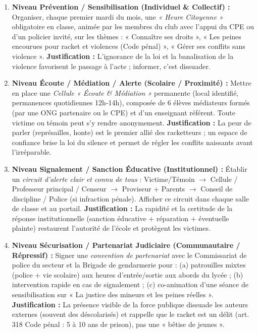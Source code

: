 \documentclass[11pt]{article}
\begin{document}
\begin{exoresolu}
\begin{enumerate}
\item \textbf{Niveau Prévention / Sensibilisation (Individuel \& Collectif) :} Organiser, chaque premier mardi du mois, une \emph{« Heure Citoyenne »} obligatoire en classe, animée par les membres du club avec l'appui du CPE ou d'un policier invité, sur les thèmes : « Connaître ses droits », « Les peines encourues pour racket et violences (Code pénal) », « Gérer ses conflits sans violence ». \textbf{Justification :} L'ignorance de la loi et la banalisation de la violence favorisent le passage à l'acte ; informer, c'est dissuader.
\item \textbf{Niveau Écoute / Médiation / Alerte (Scolaire / Proximité) :} Mettre en place une \emph{Cellule « Écoute \& Médiation »} permanente (local identifié, permanences quotidiennes 12h-14h), composée de 6 élèves médiateurs formés (par une ONG partenaire ou le CPE) et d'un enseignant référent. Toute victime ou témoin peut s'y rendre anonymement. \textbf{Justification :} La peur de parler (représailles, honte) est le premier allié des racketteurs ; un espace de confiance brise la loi du silence et permet de régler les conflits naissants avant l'irréparable.
\item \textbf{Niveau Signalement / Sanction Éducative (Institutionnel) :} Établir un \emph{circuit d'alerte clair et connu de tous} : Victime/Témoin $\rightarrow$ Cellule / Professeur principal / Censeur $\rightarrow$ Proviseur + Parents $\rightarrow$ Conseil de discipline / Police (si infraction pénale). Afficher ce circuit dans chaque salle de classe et au portail. \textbf{Justification :} La rapidité et la certitude de la réponse institutionnelle (sanction éducative + réparation + éventuelle plainte) restaurent l'autorité de l'école et protègent les victimes.
\item \textbf{Niveau Sécurisation / Partenariat Judiciaire (Communautaire / Répressif) :} Signer une \emph{convention de partenariat} avec le Commissariat de police du secteur et la Brigade de gendarmerie pour : (a) patrouilles mixtes (police + vie scolaire) aux heures d'entrée/sortie aux abords du lycée ; (b) intervention rapide en cas de signalement ; (c) co-animation d'une séance de sensibilisation sur « La justice des mineurs et les peines réelles ». \textbf{Justification :} La présence visible de la force publique dissuade les auteurs externes (souvent des déscolarisés) et rappelle que le racket est un délit (art. 318 Code pénal : 5 à 10 ans de prison), pas une « bêtise de jeunes ».
\end{enumerate}


\end{exoresolu}
\end{document}
